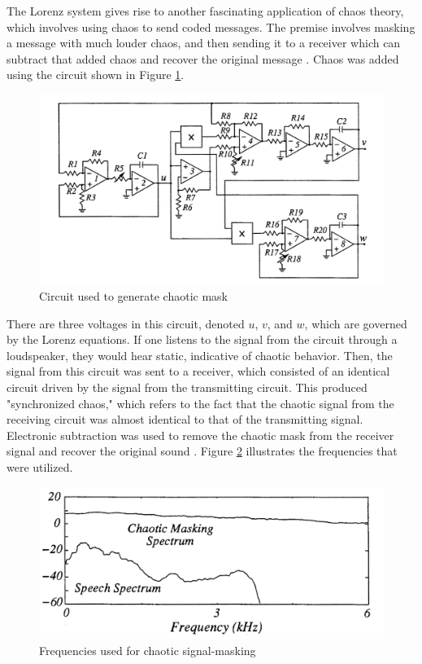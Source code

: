\documentclass[twocolumn,amsmath,amssymb,pra, floatfix]{revtex4-2}
\begin{document}
The Lorenz system gives rise to another fascinating application of chaos theory, which involves using chaos to send coded messages. The premise involves masking a message with much louder chaos, and then sending it to a receiver which can subtract that added chaos and recover the original message \cite{Strogatz}. Chaos was added using the circuit shown in Figure \ref{fig: circuit used to generate chaotic mask}. 

\begin{figure}[H]
    \centering
    \includegraphics[width = 0.7\linewidth]{images/Circuit.png}
    \caption{Circuit used to generate chaotic mask}
    \label{fig: circuit used to generate chaotic mask}
\end{figure}

There are three voltages in this circuit, denoted $u$, $v$, and $w$, which are governed by the Lorenz equations. If one listens to the signal from the circuit through a loudspeaker, they would hear static, indicative of chaotic behavior. Then, the signal from this circuit was sent to a receiver, which consisted of an identical circuit driven by the signal from the transmitting circuit. This produced "synchronized chaos," which refers to the fact that the chaotic signal from the receiving circuit was almost identical to that of the transmitting signal. Electronic subtraction was used to remove the chaotic mask from the receiver signal and recover the original sound \cite{Strogatz}. Figure \ref{fig: frequencies used for chaotic signal masking} illustrates the frequencies that were utilized.

\begin{figure}[H]
    \centering
    \includegraphics[width = 0.7\linewidth]{images/Frequency.png}
    \caption{Frequencies used for chaotic signal-masking}
    \label{fig: frequencies used for chaotic signal masking}
\end{figure}
\end{document}
